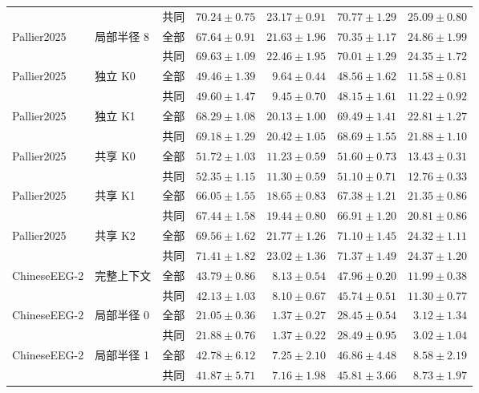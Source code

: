 \begin{longtable}{@{}lllrrrr@{}}
 &  & 共同 & $70.24\pm0.75$ & $23.17\pm0.91$ & $70.77\pm1.29$ & $25.09\pm0.80$ \\
\addlinespace
Pallier2025 & 局部半径 8 & 全部 & $67.64\pm0.91$ & $21.63\pm1.96$ & $70.35\pm1.17$ & $24.86\pm1.99$ \\
 &  & 共同 & $69.63\pm1.09$ & $22.46\pm1.95$ & $70.01\pm1.29$ & $24.35\pm1.72$ \\
\addlinespace
Pallier2025 & 独立 K0 & 全部 & $49.46\pm1.39$ & $9.64\pm0.44$ & $48.56\pm1.62$ & $11.58\pm0.81$ \\
 &  & 共同 & $49.60\pm1.47$ & $9.45\pm0.70$ & $48.15\pm1.61$ & $11.22\pm0.92$ \\
\addlinespace
Pallier2025 & 独立 K1 & 全部 & $68.29\pm1.08$ & $20.13\pm1.00$ & $69.49\pm1.41$ & $22.81\pm1.27$ \\
 &  & 共同 & $69.18\pm1.29$ & $20.42\pm1.05$ & $68.69\pm1.55$ & $21.88\pm1.10$ \\
\addlinespace
Pallier2025 & 共享 K0 & 全部 & $51.72\pm1.03$ & $11.23\pm0.59$ & $51.60\pm0.73$ & $13.43\pm0.31$ \\
 &  & 共同 & $52.35\pm1.15$ & $11.30\pm0.59$ & $51.10\pm0.71$ & $12.76\pm0.33$ \\
\addlinespace
Pallier2025 & 共享 K1 & 全部 & $66.05\pm1.55$ & $18.65\pm0.83$ & $67.38\pm1.21$ & $21.35\pm0.86$ \\
 &  & 共同 & $67.44\pm1.58$ & $19.44\pm0.80$ & $66.91\pm1.20$ & $20.81\pm0.86$ \\
\addlinespace
Pallier2025 & 共享 K2 & 全部 & $69.56\pm1.62$ & $21.77\pm1.26$ & $71.10\pm1.45$ & $24.32\pm1.11$ \\
 &  & 共同 & $71.41\pm1.82$ & $23.02\pm1.36$ & $71.37\pm1.49$ & $24.37\pm1.20$ \\
\addlinespace
\midrule
ChineseEEG-2 & 完整上下文 & 全部 & $43.79\pm0.86$ & $8.13\pm0.54$ & $47.96\pm0.20$ & $11.99\pm0.38$ \\
 &  & 共同 & $42.13\pm1.03$ & $8.10\pm0.67$ & $45.74\pm0.51$ & $11.30\pm0.77$ \\
\addlinespace
ChineseEEG-2 & 局部半径 0 & 全部 & $21.05\pm0.36$ & $1.37\pm0.27$ & $28.45\pm0.54$ & $3.12\pm1.34$ \\
 &  & 共同 & $21.88\pm0.76$ & $1.37\pm0.22$ & $28.49\pm0.95$ & $3.02\pm1.04$ \\
\addlinespace
ChineseEEG-2 & 局部半径 1 & 全部 & $42.78\pm6.12$ & $7.25\pm2.10$ & $46.86\pm4.48$ & $8.58\pm2.19$ \\
 &  & 共同 & $41.87\pm5.71$ & $7.16\pm1.98$ & $45.81\pm3.66$ & $8.73\pm1.97$ \\

\end{longtable}
